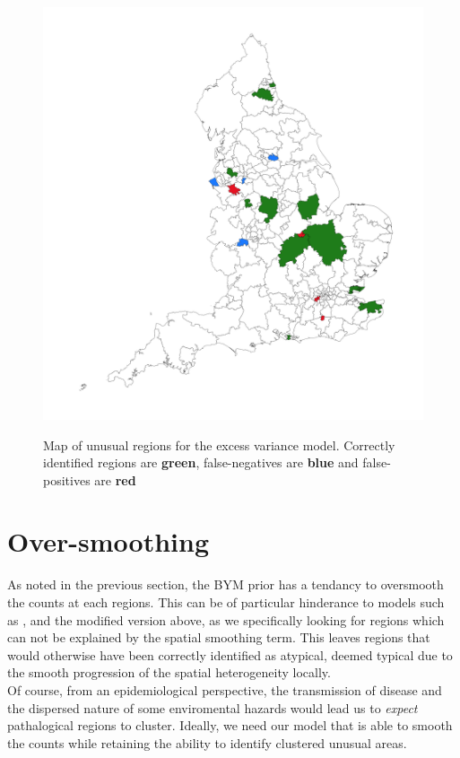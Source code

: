\documentclass[11pt]{report}
\begin{document}
\begin{figure}
\centering
\includegraphics[width=5in]{variden}
\label{fig:variden}
\caption{Map of unusual regions for the excess variance model. Correctly identified regions are {\color{Green} \bf green}, false-negatives are {\color{Blue}\bf blue} and false-positives are {\color{Red}\bf red}}
\end{figure}

\section{Over-smoothing}

As noted in the previous section, the BYM prior has a tendancy to oversmooth the counts at each regions. This can be of particular hinderance to models such as \citet{spatial}, and the modified version above, as we specifically looking for regions which can not be explained by the spatial smoothing term. This leaves regions that would otherwise have been correctly identified as atypical, deemed typical due to the smooth progression of the spatial heterogeneity locally. \\

Of course, from an epidemiological perspective, the transmission of disease and the dispersed nature of some enviromental hazards would lead us to \emph{expect} pathalogical regions to cluster. Ideally, we need our model that is able to smooth the counts while retaining the ability to identify clustered unusual areas.
\end{document}
